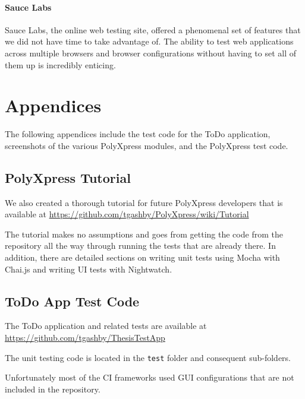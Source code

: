 \documentclass[12pt]{ucthesis}
\begin{document}
\subsubsection{Sauce Labs}
Sauce Labs, the online web testing site, offered a phenomenal set of features that we did not have time to take advantage of. The ability to test web applications across multiple browsers and browser configurations without having to set all of them up is incredibly enticing.


\chapter{Appendices}
The following appendices include the test code for the ToDo application, screenshots of the various PolyXpress modules, and the PolyXpress test code.

\section{PolyXpress Tutorial}
We also created a thorough tutorial for future PolyXpress developers that is available at \url{https://github.com/tgashby/PolyXpress/wiki/Tutorial}

The tutorial makes no assumptions and goes from getting the code from the repository all the way through running the tests that are already there. In addition, there are detailed sections on writing unit tests using Mocha with Chai.js and writing UI tests with Nightwatch.

\section{ToDo App Test Code}
The ToDo application and related tests are available at \url{https://github.com/tgashby/ThesisTestApp}

The unit testing code is located in the \lstinline{test} folder and consequent sub-folders.

Unfortunately most of the CI frameworks used GUI configurations that are not included in the repository.
\end{document}
